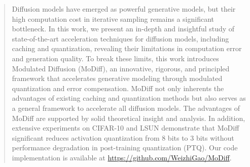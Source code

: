 \begin{abstract}
Diffusion models have emerged as powerful generative models, but their high computation cost in iterative sampling remains a significant bottleneck. In this work, we present an in-depth and insightful study of state-of-the-art acceleration techniques for diffusion models, including caching and quantization, revealing their limitations in computation error and generation quality. To break these limits, this work introduces Modulated Diffusion (MoDiff), an innovative, rigorous, and principled framework that accelerates generative modeling through modulated quantization and error compensation. MoDiff not only inherents the advantages of existing caching and quantization methods but also serves as a general framework to accelerate all diffusion models. The advantages of MoDiff are supported by solid theoretical insight and analysis. In addition, extensive experiments on CIFAR-10 and LSUN demonstrate that MoDiff significant reduces activation quantization from 8 bits to 3 bits without performance degradation in post-training quantization (PTQ). Our code implementation is available at \url{https://github.com/WeizhiGao/MoDiff}.

\end{abstract}
